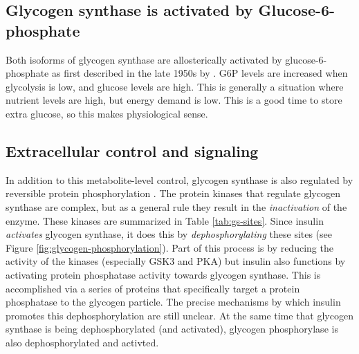 \documentclass{tufte-handout}
\begin{document}
\subsection{Glycogen synthase is activated by Glucose-6-phosphate}

Both isoforms of glycogen synthase are allosterically activated by glucose-6-phosphate as first described in the late 1950s by \citet{Leloir1959}.  G6P levels are increased when glycolysis is low, and glucose levels are high.  This is generally a situation where nutrient levels are high, but energy demand is low.  This is a good time to store extra glucose, so this makes physiological sense.

\subsection{Extracellular control and signaling}

In addition to this metabolite-level control, glycogen synthase is also regulated by reversible protein phosphorylation \citep{Larner1960}.  The protein kinases that regulate glycogen synthase are complex, but as a general rule they result in the \emph{inactivation} of the enzyme.  These kinases are summarized in Table \ref{tab:gs-sites}.  Since insulin \emph{activates} glycogen synthase, it does this by \emph{dephosphorylating} these sites (see Figure \ref{fig:glycogen-phosphorylation}).  Part of this process is by reducing the activity of the kinases (especially GSK3 and PKA) but insulin also functions by activating protein phosphatase activity towards glycogen synthase.  This is accomplished via a series of proteins that specifically target a protein phosphatase to the glycogen particle.  The precise mechanisms by which insulin promotes this dephosphorylation are still unclear.  At the same time that glycogen synthase is being dephosphorylated (and activated), glycogen phosphorylase is also dephosphorylated and activted.
\end{document}
